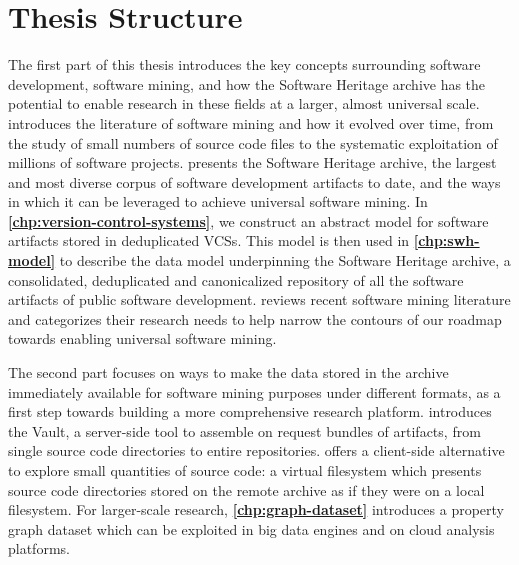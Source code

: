 \chapter*{Thesis Structure}

The first part of this thesis introduces the key concepts surrounding
software development, software mining, and how the Software Heritage archive
has the potential to enable research in these fields at a larger, almost
universal scale.
\textbf{} introduces the literature of software mining
and how it evolved over time, from the study of small numbers of source code
files to the systematic exploitation of millions of software projects.
\textbf{} presents the Software Heritage archive,
the largest and most diverse corpus of software development artifacts to date,
and the ways in which it can be leveraged to achieve universal software mining.
In \textbf{\cref{chp:version-control-systems}}, we construct an abstract model
for software artifacts stored in deduplicated \glspl{VCS}. This model is then
used in \textbf{\cref{chp:swh-model}} to describe the data model underpinning
the Software Heritage archive, a consolidated, deduplicated and canonicalized
repository of all the software artifacts of public software development.
\textbf{} reviews recent software mining
literature and categorizes their research needs to help narrow the contours of
our roadmap towards enabling universal software mining.

The second part focuses on ways to make the data stored in the
archive immediately available for software mining purposes under different
formats, as a first step towards building a more comprehensive research
platform. \textbf{} introduces the Vault, a server-side tool to
assemble on request bundles of artifacts, from single source code directories
to entire repositories. \textbf{} offers a client-side
alternative to explore small quantities of source code: a virtual filesystem
which presents source code directories stored on the remote archive as if they
were on a local filesystem.  For larger-scale research,
\textbf{\cref{chp:graph-dataset}} introduces a property graph dataset which can
be exploited in big data engines and on cloud analysis platforms.


